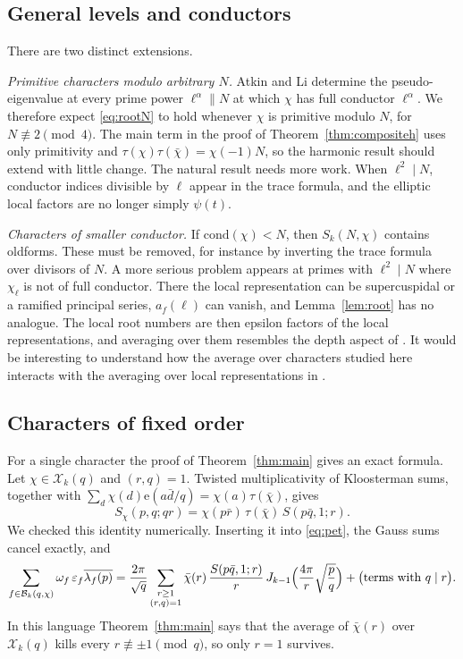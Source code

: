 \documentclass[11pt]{amsart}
\theoremstyle{remark}
\newcommand{\eps}{\varepsilon}
\newcommand{\e}{\mathrm{e}}
\newcommand{\cX}{\mathcal{X}}
\newcommand{\cB}{\mathcal{B}}
\newcommand{\ov}{\overline}
\begin{document}
\subsection{General levels and conductors}
There are two distinct extensions.

\emph{Primitive characters modulo arbitrary $N$.} Atkin and Li \cite{AL} determine the pseudo-eigenvalue at every prime power $\ell^\alpha\parallel N$ at which $\chi$ has full conductor $\ell^\alpha$. We therefore expect \eqref{eq:rootN} to hold whenever $\chi$ is primitive modulo $N$, for $N\not\equiv2\pmod4$. The main term in the proof of Theorem~\ref{thm:compositeh} uses only primitivity and $\tau(\chi)\tau(\bar\chi)=\chi(-1)N$, so the harmonic result should extend with little change. The natural result needs more work. When $\ell^2\mid N$, conductor indices divisible by $\ell$ appear in the trace formula, and the elliptic local factors are no longer simply $\psi(t)$.

\emph{Characters of smaller conductor.} If $\mathrm{cond}(\chi)<N$, then $S_k(N,\chi)$ contains oldforms. These must be removed, for instance by inverting the trace formula over divisors of $N$. A more serious problem appears at primes with $\ell^2\mid N$ where $\chi_\ell$ is not of full conductor. There the local representation can be supercuspidal or a ramified principal series, $a_f(\ell)$ can vanish, and Lemma~\ref{lem:root} has no analogue. The local root numbers are then epsilon factors of the local representations, and averaging over them resembles the depth aspect of \cite{Tom}. It would be interesting to understand how the average over characters studied here interacts with the averaging over local representations in \cite{Tom}.

\subsection{Characters of fixed order}
For a single character the proof of Theorem~\ref{thm:main} gives an exact formula. Let $\chi\in\cX_k(q)$ and $(r,q)=1$. Twisted multiplicativity of Kloosterman sums, together with $\sum_d\chi(d)\e(a\bar d/q)=\chi(a)\tau(\bar\chi)$, gives
\[
S_\chi(p,q;qr)=\chi(p\bar r)\,\tau(\bar\chi)\,S(p\bar q,1;r).
\]
We checked this identity numerically. Inserting it into \eqref{eq:pet}, the Gauss sums cancel exactly, and
\begin{equation}\label{eq:single}
\sum_{f\in\cB_k(q,\chi)}\omega_f\,\eps_f\ov{\lambda_f(p)}=\frac{2\pi}{\sqrt q}\sum_{\substack{r\ge1\\(r,q)=1}}\bar\chi(r)\,\frac{S(p\bar q,1;r)}{r}\,J_{k-1}\Bigl(\frac{4\pi}{r}\sqrt{\frac pq}\Bigr)+\bigl(\text{terms with }q\mid r\bigr).
\end{equation}
In this language Theorem~\ref{thm:main} says that the average of $\bar\chi(r)$ over $\cX_k(q)$ kills every $r\not\equiv\pm1\pmod q$, so only $r=1$ survives.
\end{document}
